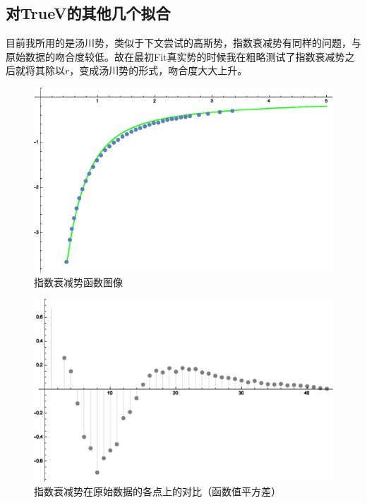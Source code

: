 \documentclass[hyperref,cs4size,titlepage,twoside]{ctexart}
\begin{document}
\subsection{对TrueV的其他几个拟合}
目前我所用的是汤川势，类似于下文尝试的高斯势，指数衰减势有同样的问题，与原始数据的吻合度较低。故在最初Fit真实势的时候我在粗略测试了指数衰减势之后就将其除以$r$，变成汤川势的形式，吻合度大大上升。

\begin{figure}[!htbp]
  \centering
  \includegraphics[width=5.2in]{Test_ReconstructLepage3.eps}
  \caption{指数衰减势函数图像}
\end{figure}
\clearpage
\begin{figure}[!htbp]
  \centering
  \includegraphics[width=5.2in]{Test_ReconstructLepage1.eps}
  \caption{指数衰减势在原始数据的各点上的对比（函数值平方差）}
\end{figure}
\end{document}
